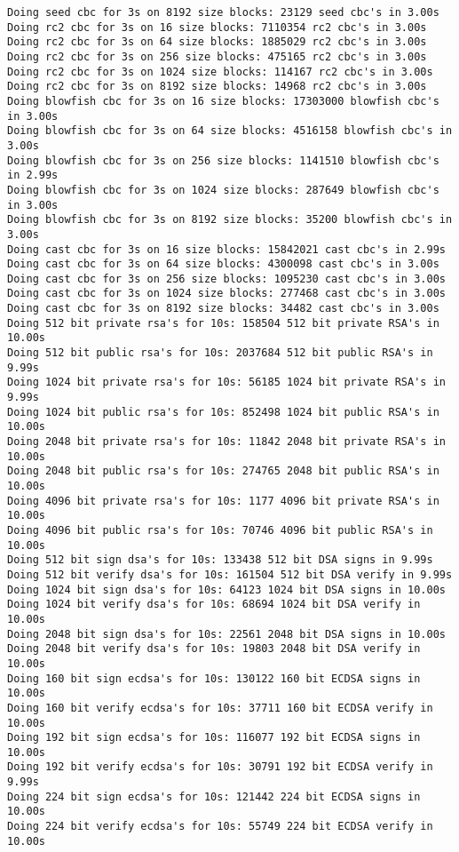 \documentclass[a4paper,11pt]{article}
\theoremstyle{mytheor}
\begin{document}
\begin{lstlisting}
Doing seed cbc for 3s on 8192 size blocks: 23129 seed cbc's in 3.00s
Doing rc2 cbc for 3s on 16 size blocks: 7110354 rc2 cbc's in 3.00s
Doing rc2 cbc for 3s on 64 size blocks: 1885029 rc2 cbc's in 3.00s
Doing rc2 cbc for 3s on 256 size blocks: 475165 rc2 cbc's in 3.00s
Doing rc2 cbc for 3s on 1024 size blocks: 114167 rc2 cbc's in 3.00s
Doing rc2 cbc for 3s on 8192 size blocks: 14968 rc2 cbc's in 3.00s
Doing blowfish cbc for 3s on 16 size blocks: 17303000 blowfish cbc's in 3.00s
Doing blowfish cbc for 3s on 64 size blocks: 4516158 blowfish cbc's in 3.00s
Doing blowfish cbc for 3s on 256 size blocks: 1141510 blowfish cbc's in 2.99s
Doing blowfish cbc for 3s on 1024 size blocks: 287649 blowfish cbc's in 3.00s
Doing blowfish cbc for 3s on 8192 size blocks: 35200 blowfish cbc's in 3.00s
Doing cast cbc for 3s on 16 size blocks: 15842021 cast cbc's in 2.99s
Doing cast cbc for 3s on 64 size blocks: 4300098 cast cbc's in 3.00s
Doing cast cbc for 3s on 256 size blocks: 1095230 cast cbc's in 3.00s
Doing cast cbc for 3s on 1024 size blocks: 277468 cast cbc's in 3.00s
Doing cast cbc for 3s on 8192 size blocks: 34482 cast cbc's in 3.00s
Doing 512 bit private rsa's for 10s: 158504 512 bit private RSA's in 10.00s
Doing 512 bit public rsa's for 10s: 2037684 512 bit public RSA's in 9.99s
Doing 1024 bit private rsa's for 10s: 56185 1024 bit private RSA's in 9.99s
Doing 1024 bit public rsa's for 10s: 852498 1024 bit public RSA's in 10.00s
Doing 2048 bit private rsa's for 10s: 11842 2048 bit private RSA's in 10.00s
Doing 2048 bit public rsa's for 10s: 274765 2048 bit public RSA's in 10.00s
Doing 4096 bit private rsa's for 10s: 1177 4096 bit private RSA's in 10.00s
Doing 4096 bit public rsa's for 10s: 70746 4096 bit public RSA's in 10.00s
Doing 512 bit sign dsa's for 10s: 133438 512 bit DSA signs in 9.99s
Doing 512 bit verify dsa's for 10s: 161504 512 bit DSA verify in 9.99s
Doing 1024 bit sign dsa's for 10s: 64123 1024 bit DSA signs in 10.00s
Doing 1024 bit verify dsa's for 10s: 68694 1024 bit DSA verify in 10.00s
Doing 2048 bit sign dsa's for 10s: 22561 2048 bit DSA signs in 10.00s
Doing 2048 bit verify dsa's for 10s: 19803 2048 bit DSA verify in 10.00s
Doing 160 bit sign ecdsa's for 10s: 130122 160 bit ECDSA signs in 10.00s 
Doing 160 bit verify ecdsa's for 10s: 37711 160 bit ECDSA verify in 10.00s
Doing 192 bit sign ecdsa's for 10s: 116077 192 bit ECDSA signs in 10.00s 
Doing 192 bit verify ecdsa's for 10s: 30791 192 bit ECDSA verify in 9.99s
Doing 224 bit sign ecdsa's for 10s: 121442 224 bit ECDSA signs in 10.00s 
Doing 224 bit verify ecdsa's for 10s: 55749 224 bit ECDSA verify in 10.00s

\end{lstlisting}
\end{document}
